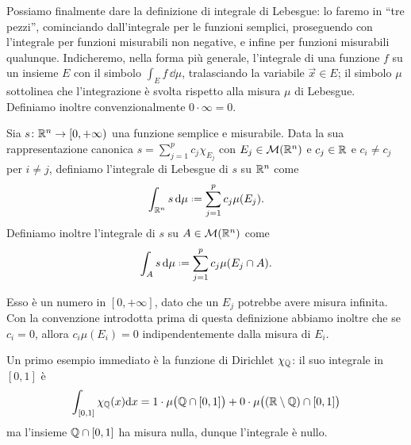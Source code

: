 Possiamo finalmente dare la definizione di integrale di Lebesgue: lo faremo in ``tre pezzi'', cominciando dall'integrale per le funzioni semplici, proseguendo con l'integrale per funzioni misurabili non negative, e infine per funzioni misurabili qualunque.
Indicheremo, nella forma più generale, l'integrale di una funzione $f$ su un insieme $E$ con il simbolo $\int_Ef\,\dd\mu$, tralasciando la variabile $\vec x\in E$; il simbolo $\mu$ sottolinea che l'integrazione è svolta rispetto alla misura $\mu$ di Lebesgue.
Definiamo inoltre convenzionalmente $0\cdot\infty=0$.
\begin{definizione} \label{d:integrale-lebesgue-funzioni-semplici}
	Sia $s\colon\mathbb{R}^n\to[0,+\infty)$ una funzione semplice e misurabile.
	Data la sua rappresentazione canonica $s=\sum_{j=1}^p c_j\chi_{E_j}$ con $E_j\in\mathcal M(\mathbb{R}^n)$ e $c_j\in\mathbb{R}$ e	$c_i\neq c_j$ per $i\neq j$, definiamo l'integrale di Lebesgue di $s$ su $\mathbb{R}^n$ come
	\begin{equation}
		\int_{\R^n}s\,\dd\mu\defeq \sum_{j=1}^pc_j\mu(E_j).
		\label{eq:integrale-lebesgue-funzioni-semplici}
	\end{equation}
	Definiamo inoltre l'integrale di $s$ su $A\in\mathcal M(\mathbb{R}^n)$ come
	\begin{equation}
		\int_As\,\dd\mu\defeq \sum_{j=1}^pc_j\mu(E_j\cap A).
	\end{equation}
\end{definizione}
Esso è un numero in $[0,+\infty]$, dato che un $E_j$ potrebbe avere misura infinita.
Con la convenzione introdotta prima di questa definizione abbiamo inoltre che se $c_i=0$, allora $c_i\mu(E_i)=0$ indipendentemente dalla misura di $E_i$.

Un primo esempio immediato è la funzione di Dirichlet $\chi_{\mathbb{Q}}$: il suo integrale in $[0,1]$ è
\begin{equation*}
	\int_{[0,1]}\chi_{\mathbb{Q}}(x)\textup{d} x=1\cdot\mu\big(\mathbb{Q}\cap[0,1]\big)+0\cdot\mu\big( (\mathbb{R}\setminus\mathbb{Q})\cap[0,1]\big)
\end{equation*}
ma l'insieme $\mathbb{Q}\cap[0,1]$ ha misura nulla, dunque l'integrale è nullo.

